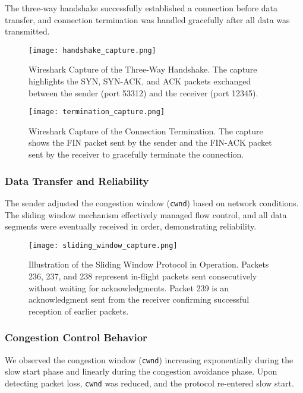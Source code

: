 \documentclass[11pt]{article}
\begin{document}
The three-way handshake successfully established a connection before data transfer, and connection termination was handled gracefully after all data was transmitted.

\begin{figure}[H]
    \centering
     \texttt{[image: handshake\_capture.png]}
    \caption{Wireshark Capture of the Three-Way Handshake. The capture highlights the SYN, SYN-ACK, and ACK packets exchanged between the sender (port 53312) and the receiver (port 12345).}
    \label{fig:handshake}
\end{figure}

\begin{figure}[H]
    \centering
     \texttt{[image: termination\_capture.png]}
    \caption{Wireshark Capture of the Connection Termination. The capture shows the FIN packet sent by the sender and the FIN-ACK packet sent by the receiver to gracefully terminate the connection.}
    \label{fig:termination}
\end{figure}

\subsubsection{Data Transfer and Reliability}

The sender adjusted the congestion window (\texttt{cwnd}) based on network conditions. The sliding window mechanism effectively managed flow control, and all data segments were eventually received in order, demonstrating reliability.

\begin{figure}[H]
    \centering
    \texttt{[image: sliding\_window\_capture.png]}
    \caption{Illustration of the Sliding Window Protocol in Operation. Packets 236, 237, and 238 represent in-flight packets sent consecutively without waiting for acknowledgments. Packet 239 is an acknowledgment sent from the receiver confirming successful reception of earlier packets.}
    \label{fig:sliding_window_flow}
\end{figure}

\subsubsection{Congestion Control Behavior}

We observed the congestion window (\texttt{cwnd}) increasing exponentially during the slow start phase and linearly during the congestion avoidance phase. Upon detecting packet loss, \texttt{cwnd} was reduced, and the protocol re-entered slow start.
\end{document}
